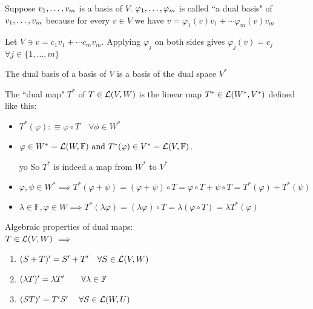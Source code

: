 \setcounter{thm}{113}
\begin{thm}
  Suppose $v_1, \dots, v_m$ is a basis of $V$. $\varphi_1, \dots, \varphi_m$ is called ``a dual basis" of $v_1, \dots, v_m$ because for every $v \in V$ we have $v=\varphi_1 (v)v_1 + \cdots \varphi_m(v)v_m$
\end{thm}
\begin{prf}
  Let $V \ni v= c_1v_1 + \cdots c_mv_m$. Applying
  $\varphi_j$ on both sides gives $\varphi_j(v)=c_j$ $\forall j\in \{1, \dots, m\}$
  
\end{prf}

\setcounter{thm}{115}
\begin{thm}
  The dual basis of a basis of $V$ is a basis of the dual space $V^{*}$
\end{thm}

\setcounter{thm}{117}
\begin{mydef}

  The ``dual map" $T^{*}$ of $T \in \mathcal{L}(V,W)$ is the linear map $T^{*} \in {\mathcal{L}(W^{*}, V^{*})}$ defined like this:

  \begin{itemize}
    \item[] $T^{*}(\varphi) :\equiv \varphi \circ T \quad \forall \phi \in W^{*}$
    \item $\varphi \in W^{*}={\mathcal{L}(W, \mathbb{F})} \text{ and } T^{*}(\varphi) \in V^{*} = {\mathcal{L}(V, \mathbb{F})}$.

    yo
    So $T^{*}$ is indeed a map from $W^{*}$ to $V^{*}$


    \item $\varphi, \psi \in W^{*} \implies T^{*} (\varphi + \psi) = (\varphi + \psi) \circ T = \varphi \circ T + \psi \circ T = T^{*} (\varphi) + T^{*} (\psi)$
    \item $\lambda \in \mathbb{F}, \varphi \in W \implies T^{*} (\lambda \varphi) = (\lambda \varphi) \circ T = \lambda (\varphi \circ T) = \lambda T^{*} (\varphi)$
  \end{itemize}

\end{mydef}

\setcounter{thm}{119}
\begin{thm}
  \label{algebraic-properties-of-dual-maps}
  Algebraic properties of dual maps:  \\
  $T \in \mathcal{L}(V,W)$ $\implies$
  \begin{enumerate}
    \item $(S+T)' = S' + T' \quad \forall S \in \mathcal{L}(V,W)$
    \item $(\lambda T)' = \lambda T' \quad \quad \forall \lambda \in \mathbb{F}$
    \item $(ST)' = T'S' \quad \; \forall S \in \mathcal{L} (W,U)$
  \end{enumerate}
\end{thm}

